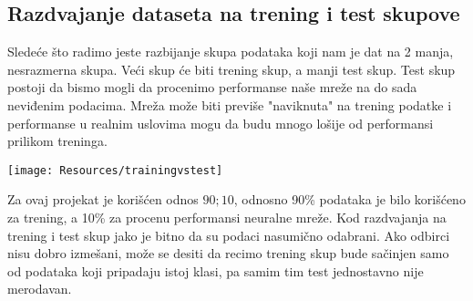 \documentclass{article}
\newenvironment{solution}[2][]
    { \begin{mdframed}[backgroundcolor=gray!0] \textbf{#1 #2}}
    {  \end{mdframed}}
\begin{document}
    \begin{solution}{}
        \subsection*{Razdvajanje dataseta na trening i test skupove}
    Sledeće što radimo jeste razbijanje skupa podataka koji nam je dat na 2 manja, nesrazmerna skupa. Veći skup će biti trening skup, a manji test skup. Test skup postoji da bismo mogli da procenimo performanse naše mreže na do sada neviđenim podacima. Mreža može biti previše "naviknuta" na trening podatke i performanse u realnim uslovima mogu da budu mnogo lošije od performansi prilikom treninga.
    
     \begin{center}
        \texttt{[image: Resources/trainingvstest]}

    \end{center}
    Za ovaj projekat je korišćen odnos $90 ; 10$, odnosno 90\% podataka je bilo korišćeno za trening, a 10\% za procenu performansi neuralne mreže. Kod razdvajanja na trening i test skup jako je bitno da su podaci nasumično odabrani. Ako odbirci nisu dobro izmešani, može se desiti da recimo trening skup bude sačinjen samo od podataka koji pripadaju istoj klasi, pa samim tim test jednostavno nije merodavan.
    \end{solution}
    \newpage
\end{document}
